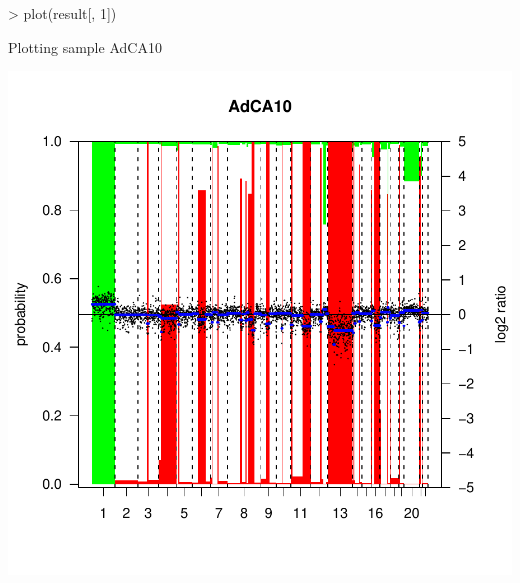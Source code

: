 \documentclass[11pt]{article}
\begin{document}
\begin{center}
\begin{Schunk}
\begin{Sinput}
> plot(result[, 1])
\end{Sinput}
\begin{Soutput}
Plotting sample AdCA10 
\end{Soutput}
\end{Schunk}
\includegraphics{CGHcall-006}
\end{center}
\end{document}
